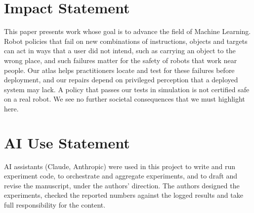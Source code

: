\documentclass{article}
\begin{document}
\section*{Impact Statement}

This paper presents work whose goal is to advance the field of Machine Learning. Robot policies that fail on new combinations of instructions, objects and targets can act in ways that a user did not intend, such as carrying an object to the wrong place, and such failures matter for the safety of robots that work near people. Our atlas helps practitioners locate and test for these failures before deployment, and our repairs depend on privileged perception that a deployed system may lack. A policy that passes our tests in simulation is not certified safe on a real robot. We see no further societal consequences that we must highlight here.

\section*{AI Use Statement}

AI assistants (Claude, Anthropic) were used in this project to write and run experiment code, to orchestrate and aggregate experiments, and to draft and revise the manuscript, under the authors' direction. The authors designed the experiments, checked the reported numbers against the logged results and take full responsibility for the content.




\newpage
\appendix
\onecolumn

\end{document}
